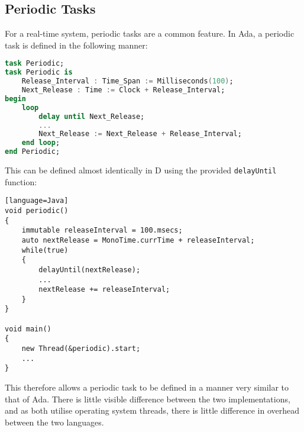 \subsection{Periodic Tasks}
For a real-time system, periodic tasks are a common feature. In Ada, a periodic
task is defined in the following manner: 
\begin{lstlisting}[basicstyle=\small,language=Ada]
task Periodic; 
task Periodic is 
    Release_Interval : Time_Span := Milliseconds(100); 
    Next_Release : Time := Clock + Release_Interval; 
begin
    loop 
        delay until Next_Release; 
        ... 
        Next_Release := Next_Release + Release_Interval; 
    end loop; 
end Periodic; 
\end{lstlisting}
This can be defined almost identically in D using the provided
\texttt{delayUntil} function: 
\begin{lstlisting}[basicstyle=\small][language=Java]
void periodic()
{
    immutable releaseInterval = 100.msecs; 
    auto nextRelease = MonoTime.currTime + releaseInterval; 
    while(true)
    {
        delayUntil(nextRelease); 
        ...
        nextRelease += releaseInterval; 
    }
}

void main()
{
    new Thread(&periodic).start; 
    ...
}
\end{lstlisting}
This therefore allows a periodic task to be defined in a manner very
similar to that of Ada. There is little visible difference between the two
implementations, and as both utilise operating system threads, there is little
difference in overhead between the two languages. 


